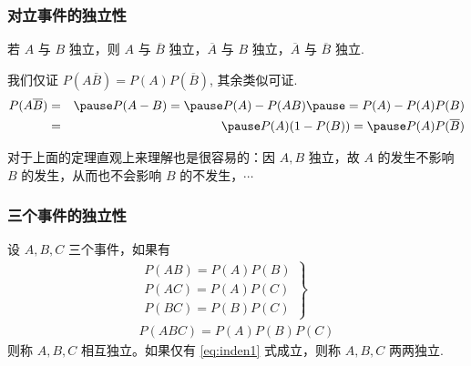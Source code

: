 \begin{frame}
	\frametitle{对立事件的独立性}
	\begin{thm}
		若 $A$ 与 $B$ 独立，则 $A$ 与 $\overline{B}$ 独立，$\overline{A}$ 与 $B$ 独立，$\overline{A}$ 与 $\overline{B}$ 独立.
	\end{thm}
	\pause

	\zheng 我们仅证 $P (A\overline{B})=P (A) P (\overline{B})$, 其余类似可证.
	\begin{eqnarray*}
		P(A\overline{B})&=&\pause P(A-B)=\pause P(A)-P(AB)\pause =P(A)-P(A)P(B)\\
		&=&\pause P(A)(1-P(B))=\pause P(A)P(\overline{B})
	\end{eqnarray*}

	\pause
	对于上面的定理直观上来理解也是很容易的：因 $A,B$ 独立，故 $A$ 的发生不影响 $B$ 的发生，从而也不会影响 $B$ 的不发生，$\cdots$
\end{frame}









   \begin{frame}
	\frametitle{三个事件的独立性}
	\begin{defi}
		设 $A,B,C$ 三个事件，如果有
		\begin{eqnarray}\label{eq:inden1}
			\left.\begin{array}{l}
				P(AB)=P(A)P(B)\\
				P(AC)=P(A)P(C) \\
				P(BC)=P(B)P(C)
			\end{array}\right\}\\
			\label{eq:inden2}
			P(ABC)=P(A)P(B)P(C)
		\end{eqnarray}
		则称 $A,B,C$ 相互独立。如果仅有 \eqref{eq:inden1} 式成立，则称 $A,B,C$ 两两独立.
	\end{defi}
\end{frame}

